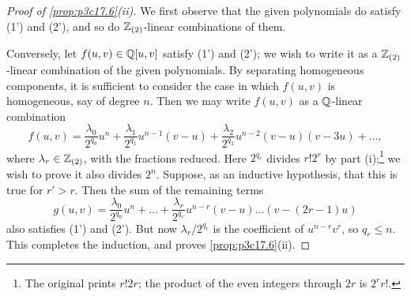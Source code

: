 \documentclass[../main]{subfiles}
\begin{document}
\begin{proof}[Proof of \ref{prop:p3c17.6}(ii)]
We first observe that the given polynomials do satisfy (1') and (2'), and so do $\mathbb{Z}_{(2)}$-linear combinations of them.

Conversely, let $f(u,v)\in\mathbb{Q}[u,v]$ satisfy (1') and (2'); we wish to write it as a $\mathbb{Z}_{(2)}$-linear combination of the given polynomials. By separating homogeneous components, it is sufficient to consider the case in which $f(u,v)$ is homogeneous, say of degree $n$. Then we may write $f(u,v)$ as a $\mathbb{Q}$-linear combination
\[f(u,v)=\frac{\lambda_0}{2^{q_0}}u^n+\frac{\lambda_1}{2^{q_1}}u^{n-1}(v-u)+\frac{\lambda_2}{2^{q_2}}u^{n-2}(v-u)(v-3u)+\ldots,\]
where $\lambda_r\in\mathbb{Z}_{(2)}$, with the fractions reduced. Here $2^{q_r}$ divides $r!2^r$ by part (i);\footnote{The original prints $r!2r$; the product of the even integers through $2r$ is $2^rr!$.} we wish to prove it also divides $2^n$. Suppose, as an inductive hypothesis, that this is true for $r'>r$. Then the sum of the remaining terms
\[g(u,v)=\frac{\lambda_0}{2^{q_0}}u^n+\ldots+\frac{\lambda_r}{2^{q_r}}u^{n-r}(v-u)\ldots(v-(2r-1)u)\]
also satisfies (1') and (2'). But now $\lambda_r/2^{q_r}$ is the coefficient of $u^{n-r}v^r$, so $q_r\le n$. This completes the induction, and proves \ref{prop:p3c17.6}(ii).
\end{proof}
\end{document}
